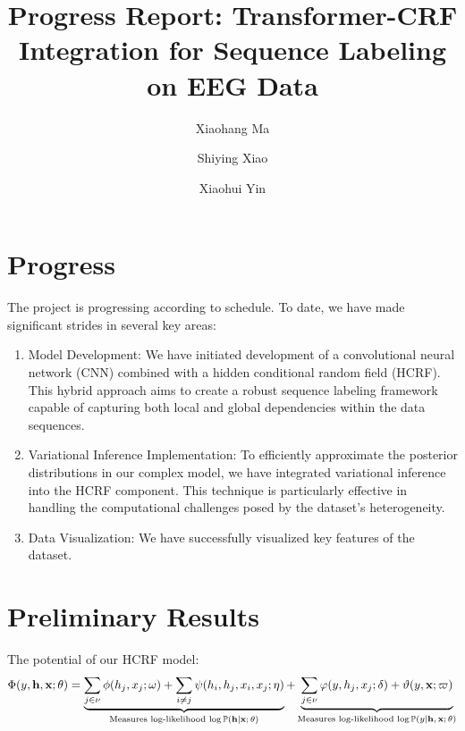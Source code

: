 \documentclass[10pt]{article}
\newcommand{\PP}{{\mathbb{P}}}
\newcommand{\hb}{\mathbf{h}}
\newcommand{\xb}{\mathbf{x}}
\begin{document}
\title{Progress Report: Transformer-CRF Integration for Sequence Labeling on
EEG Data}

\author[1]{Xiaohang Ma}
\author[2]{Shiying Xiao}
\author[2]{Xiaohui Yin}


\date{}

\maketitle


\section{Progress}


The project is progressing according to schedule. To date, we have made
significant strides in several key areas:
\begin{enumerate}
\item Model Development:
We have initiated development of a convolutional neural network (CNN) combined
with a hidden conditional random field (HCRF). This hybrid approach aims to
create a robust sequence labeling framework capable of capturing both local
and global dependencies within the data sequences.
\item Variational Inference Implementation:
To efficiently approximate the posterior distributions in our complex model,
we have integrated variational inference into the HCRF component.
This technique is particularly effective in handling the computational
challenges posed by the dataset's heterogeneity.
\item Data Visualization:
We have successfully visualized key features of the dataset.
\end{enumerate}


\section{Preliminary Results}


The potential of our HCRF model:
\begin{equation*}
\Phi(y, \hb, \xb; \theta) = \underbrace{
\sum_{j \in \nu} \phi(h_j, x_j; \omega) +
\sum_{i \neq j} \psi(h_i, h_j, x_i, x_j; \eta)}_{
\textrm{Measures log-likelihood $\log\PP ( \hb \vert \xb; \theta)$}}
+ \underbrace{
\sum_{j \in \nu} \varphi(y, h_j, x_j; \delta) +
\vartheta(y, \xb; \varpi)}_{
\textrm{Measures log-likelihood $\log \PP (y \vert \hb, \xb; \theta)$}}
\end{equation*}
\end{document}
